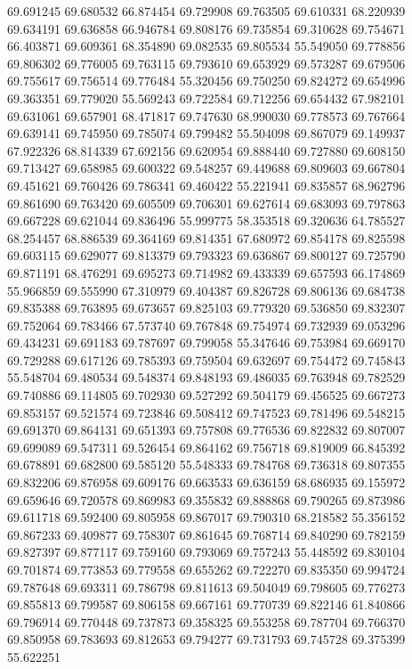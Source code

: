 69.691245
69.680532
66.874454
69.729908
69.763505
69.610331
68.220939
69.634191
69.636858
66.946784
69.808176
69.735854
69.310628
69.754671
66.403871
69.609361
68.354890
69.082535
69.805534
55.549050
69.778856
69.806302
69.776005
69.763115
69.793610
69.653929
69.573287
69.679506
69.755617
69.756514
69.776484
55.320456
69.750250
69.824272
69.654996
69.363351
69.779020
55.569243
69.722584
69.712256
69.654432
67.982101
69.631061
69.657901
68.471817
69.747630
68.990030
69.778573
69.767664
69.639141
69.745950
69.785074
69.799482
55.504098
69.867079
69.149937
67.922326
68.814339
67.692156
69.620954
69.888440
69.727880
69.608150
69.713427
69.658985
69.600322
69.548257
69.449688
69.809603
69.667804
69.451621
69.760426
69.786341
69.460422
55.221941
69.835857
68.962796
69.861690
69.763420
69.605509
69.706301
69.627614
69.683093
69.797863
69.667228
69.621044
69.836496
55.999775
58.353518
69.320636
64.785527
68.254457
68.886539
69.364169
69.814351
67.680972
69.854178
69.825598
69.603115
69.629077
69.813379
69.793323
69.636867
69.800127
69.725790
69.871191
68.476291
69.695273
69.714982
69.433339
69.657593
66.174869
55.966859
69.555990
67.310979
69.404387
69.826728
69.806136
69.684738
69.835388
69.763895
69.673657
69.825103
69.779320
69.536850
69.832307
69.752064
69.783466
67.573740
69.767848
69.754974
69.732939
69.053296
69.434231
69.691183
69.787697
69.799058
55.347646
69.753984
69.669170
69.729288
69.617126
69.785393
69.759504
69.632697
69.754472
69.745843
55.548704
69.480534
69.548374
69.848193
69.486035
69.763948
69.782529
69.740886
69.114805
69.702930
69.527292
69.504179
69.456525
69.667273
69.853157
69.521574
69.723846
69.508412
69.747523
69.781496
69.548215
69.691370
69.864131
69.651393
69.757808
69.776536
69.822832
69.807007
69.699089
69.547311
69.526454
69.864162
69.756718
69.819009
66.845392
69.678891
69.682800
69.585120
55.548333
69.784768
69.736318
69.807355
69.832206
69.876958
69.609176
69.663533
69.636159
68.686935
69.155972
69.659646
69.720578
69.869983
69.355832
69.888868
69.790265
69.873986
69.611718
69.592400
69.805958
69.867017
69.790310
68.218582
55.356152
69.867233
69.409877
69.758307
69.861645
69.768714
69.840290
69.782159
69.827397
69.877117
69.759160
69.793069
69.757243
55.448592
69.830104
69.701874
69.773853
69.779558
69.655262
69.722270
69.835350
69.994724
69.787648
69.693311
69.786798
69.811613
69.504049
69.798605
69.776273
69.855813
69.799587
69.806158
69.667161
69.770739
69.822146
61.840866
69.796914
69.770448
69.737873
69.358325
69.553258
69.787704
69.766370
69.850958
69.783693
69.812653
69.794277
69.731793
69.745728
69.375399
55.622251
